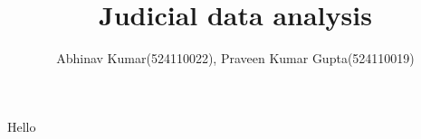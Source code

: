 \documentclass{report}
\title{Judicial data analysis}
\author{Abhinav Kumar(524110022), Praveen Kumar Gupta(524110019)}
\begin{document}
\maketitle
Hello
\end{document}
